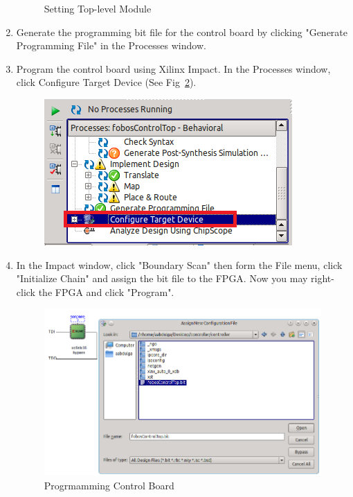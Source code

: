 \begin{enumerate}
\begin{figure}[H]
\begin{center}
		\caption{\label{fig:ctrl-set-top-level}Setting Top-level Module}
		\end{center} 
		\vspace{-1ex}
		\end{figure}
  \item Generate the programming bit file for the control board by clicking "Generate Programming File" in the Processes window.
  \item Program the control board using Xilinx Impact. In the Processes window, click Configure Target Device (See Fig~\ref{fig:ctrl-run-impact}).
		\begin{figure}[H]
		\begin{center}
		\includegraphics[scale=0.6]{figures/ctrl-run-impact}
		\caption{\label{fig:ctrl-run-impact}}
		\end{center}
		\vspace{-1ex}
		\end{figure}
  \item In the Impact window, click "Boundary Scan" then form the File menu, click "Initialize Chain" and assign the bit file to the FPGA. Now you may right-click the FPGA and click "Program".
		\begin{figure}[H]
		\begin{center}
		\includegraphics[scale=0.6]{figures/ctrl-program}
		\caption{\label{fig:ctrl-program}Progrmamming Control Board}
		\end{center}
		\vspace{-1ex}
		\end{figure}
  \end{enumerate}

